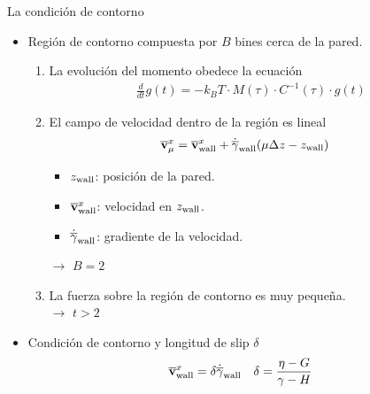 \documentclass{beamer}
\newcommand{\esc}{\!\cdot\!}
\begin{document}
\begin{frame}{La condición de contorno}
  \begin{itemize}
    \item<1-> \alert{Región de contorno} compuesta por $B$ bines cerca de la pared.
  \begin{enumerate}
    \item<1-> La evolución del momento obedece la ecuación
      \begin{align}
        \frac{d}{dt}g(t)=-k_BT\esc M(\tau)\esc C^{-1}(\tau)\esc g(t)
        \nonumber
      \end{align}
\item<2-> El campo de velocidad dentro de la región es lineal 
\begin{align}
\overline{\bf v}^x_{\mu}&=  \overline{\bf v}^x_{\rm wall}+\dot{\overline{\gamma}}_{\rm wall}(\mu\Delta z-z_{\rm wall})
\nonumber
\end{align}
      \begin{itemize}
        \item $z_{\rm wall}$: posición de la pared.
        \item $\overline{\bf v}^x_{\rm wall}$: velocidad en  $z_{\rm wall}$.
        \item $\dot{\overline{\gamma}}_{\rm wall}$: gradiente de la velocidad.
      \end{itemize}
      $\rightarrow$ $B=2$
    \item<3-> La fuerza sobre la región de contorno es muy pequeña. \\
      $\rightarrow$ $t>2$
  \end{enumerate}
\item<4-> Condición de contorno y longitud de slip $\delta$
\begin{align}
\overline{\bf v}^x_{\rm wall}=\delta\dot{\overline{\gamma}}_{\rm wall}
  && \delta=\frac{\eta-G}{\gamma-H}
  \nonumber
\end{align}
  \end{itemize}
\end{frame}

\end{document}
